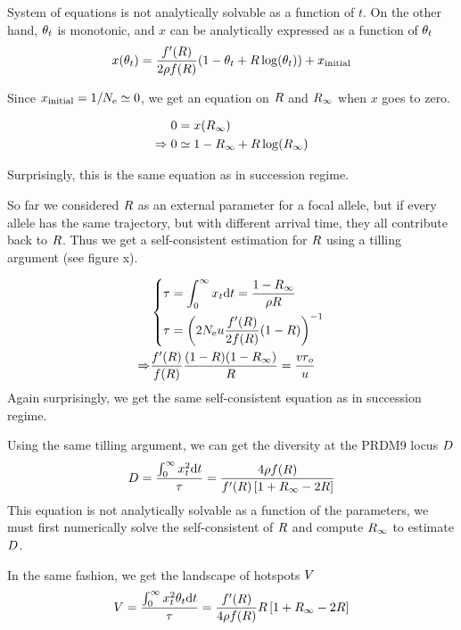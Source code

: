 \documentclass{article}
\begin{document}
System of equations is not analytically solvable as a function of $t$. On the other hand, $\theta_{t}$ is monotonic, and $x$ can be analytically expressed as a function of $\theta_{t}$
\begin{equation}
x(\theta_{t} ) =\dfrac{f'(R)}{2 \rho f(R )} (1- \theta_{t}  + R  \operatorname{log}(\theta_{t} )) + x_{\mathrm{initial}}
\end{equation}

Since $x_{\mathrm{initial}} = 1 / N_\mathrm{e} \simeq 0$, we get an equation on $R$ and ${R_{\infty}}$ when $x$ goes to zero.

\begin{align}
 	0 &=  x({R_{\infty}}) \\
   \Rightarrow 0 &\simeq  1-{R_{\infty}}  + R  \operatorname{log}({R_{\infty}} ) 
\end{align}

Surprisingly, this is the same equation as in succession regime.

So far we considered $R$ as an external parameter for a focal allele, but if every allele has the same trajectory, but with different arrival time, they all contribute back to $R$. Thus we get a self-consistent estimation for  $R$ using a tilling argument (see figure x). 

\begin{align} 
  & \left\{
  \begin{aligned}
    \tau &= \int_{0}^{\infty } x_{t} \mathrm{d}  t = \dfrac{1 - {R_{\infty}} }{\rho R } \\
    \tau &= \left( 2 N_\mathrm{e} u \dfrac{f'(R )}{2f(R )} (1-R )  \right)^{-1}
  \end{aligned}
  \right. \\
   \Rightarrow &
    \dfrac{f'(R )}{f(R )} \dfrac{(1- R )(1- {R_{\infty}} )}{R } = \dfrac{v r_o}{ u}
\end{align}
Again surprisingly, we get the same self-consistent equation as in succession regime.

Using the same tilling argument, we can get the diversity at the PRDM9 locus $D$
\begin{equation}
  D = \dfrac{\int_{0}^{\infty } x_{t}^2 \mathrm{d}  t}{\tau} = \dfrac{4\rho f(R )}{f'(R )\left[ 1 + {R_{\infty}}  - 2 R   \right]} 
\end{equation}
This equation is not analytically solvable as a function of the parameters, we must first numerically solve the self-consistent of $R$ and compute ${R_{\infty}}$ to estimate $D$.

In the same fashion, we get the landscape of hotspots $V$
\begin{equation}
    V = \dfrac{\int_{0}^{\infty } x_{t}^2 \theta_{t} \mathrm{d}  t}{\tau} = \dfrac{f'(R )}{4 \rho f(R )}R \left[ 1 + {R_{\infty}}  - 2 R   \right] 
\end{equation}
\end{document}
